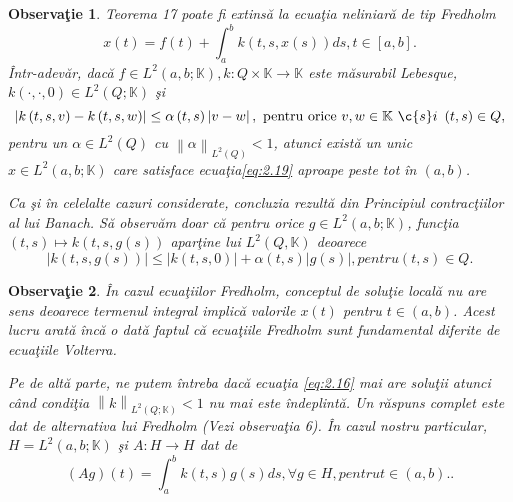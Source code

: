\documentclass[a4paper,12pt,oneside]{report}
\newtheorem{remark}{Observa\c{t}ie}
\begin{document}
\begin{remark}

Teorema 17 poate fi extins\u{a} la ecua\c{t}ia neliniar\u{a} de tip Fredholm
\begin{displaymath}
x\left ( t \right ) = f\left ( t \right ) + \int_{a}^{b}k\left ( t,s,x\left ( s \right ) \right )ds, t\in \left [ a,b \right ]. \label{eq:2.19} \tag{2.19}
\end{displaymath}
\^{I}ntr-adev\u{a}r, dac\u{a} \(f\in L^{2}\left ( a,b;\mathbb{K} \right ), k:Q\times \mathbb{K}\rightarrow \mathbb{K}\) este m\u{a}surabil Lebesque,  \(k\left ( \cdot ,\cdot ,0 \right )\in L^{2}\left ( Q; \mathbb{K} \right ) \) \c{s}i
\begin{displaymath}
\left | k\left ( t,s,v \right ) - k\left ( t,s,w \right ) \right |\leq \alpha \left ( t,s \right )\left | v - w \right |,~ \text{pentru orice}~ v,w \in \mathbb{K}~ \c{s}i~ \left ( t,s \right ) \in Q,
\end{displaymath}
pentru un \(\alpha \in L^{2}\left ( Q \right )\) cu \(\left \| \alpha  \right \|_{L^{2}\left ( Q \right )} < 1\), atunci exist\u{a} un unic \(x\in L^{2}\left ( a,b; \mathbb{K} \right )\) care satisface ecua\c{t}ia\ref{eq:2.19} aproape peste tot \^{i}n \(\left (a,b  \right )\).

Ca \c{s}i \^{i}n celelalte cazuri considerate, concluzia rezult\u{a} din Principiul contrac\c{t}iilor al lui Banach. S\u{a} observ\u{a}m doar c\u{a} pentru orice \(g\in L^{2}\left ( a,b; \mathbb{K} \right )\), func\c{t}ia \(\left (t,s  \right )  \mapsto k\left ( t,s,g\left ( s \right ) \right )\) apar\c{t}ine lui \(L^{2}\left ( Q, \mathbb{K} \right )\) deoarece
\begin{displaymath}
\left | k\left ( t,s,g\left ( s \right ) \right ) \right | \leq \left | k\left ( t,s,0 \right ) \right | + \alpha \left ( t,s \right )\left | g\left ( s \right ) \right |, pentru \left ( t,s \right )\in Q.
\end{displaymath}
\end{remark}

\begin{remark}
\^{I}n cazul ecua\c{t}iilor Fredholm, conceptul de solu\c{t}ie local\u{a} nu are sens deoarece termenul integral implic\u{a} valorile \(x\left ( t \right )\) pentru \(t\in \left ( a,b \right )\). Acest lucru arat\u{a} \^{i}nc\u{a} o dat\u{a} faptul c\u{a} ecua\c{t}iile Fredholm sunt fundamental diferite de ecua\c{t}iile Volterra.

\noindent Pe de alt\u{a} parte, ne putem \^{i}ntreba dac\u{a} ecua\c{t}ia \ref{eq:2.16} mai are solu\c{t}ii atunci c\^{a}nd condi\c{t}ia \(\left \| k \right \|_{L^{2}\left ( Q;\mathbb{K} \right )}< 1\) nu mai este \^{i}ndeplint\u{a}. Un r\u{a}spuns complet este dat de alternativa lui Fredholm (Vezi observa\c{t}ia 6). \^{I}n cazul nostru particular, \(H = L^{2}\left ( a,b;\mathbb{K} \right )\) \c{s}i \(A : H \rightarrow H\) dat de
\begin{displaymath}
\left ( Ag \right )\left ( t \right ) = \int_{a}^{b}k\left ( t,s \right )g\left ( s \right )ds, \forall g\in H, pentru t\in \left ( a,b \right ). \label{eq:2.20} \tag{2.20}.
\end{displaymath}
\end{remark}
\end{document}
